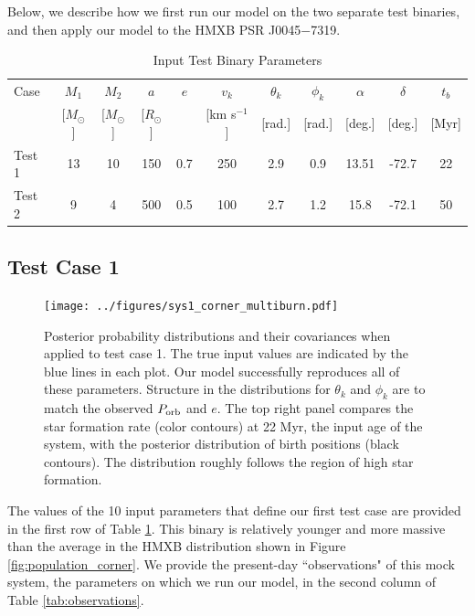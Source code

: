 \documentclass[usenatbib]{mnras}
\begin{document}
Below, we describe how we first run our model on the two separate test binaries, and then apply our model to the HMXB PSR J0045$-$7319.


\begin{table}
\label{tab:mock_data}
\begin{center}
\caption{Input Test Binary Parameters}
\begin{tabular}{lcccccccccc} 
\toprule
Case & $M_1$ & $M_2$ & $a$ & $e$ & $v_k$ & $\theta_k$ & $\phi_k$ & $\alpha$ & $\delta$ & $t_b$ \\
 & [$M_{\odot}$] & [$M_{\odot}$] & [$R_{\odot}$] & & [km s$^{-1}$] & [rad.] & [rad.] & [deg.] & [deg.] & [Myr] \\ 
\midrule
Test 1 & 13 & 10 & 150 & 0.7 & 250 & 2.9 & 0.9 & 13.51 & -72.7 & 22 \\
Test 2 & 9 & 4 & 500 & 0.5 & 100 & 2.7 & 1.2 & 15.8 & -72.1 & 50 \\
\bottomrule
\end{tabular}
\end{center}
\end{table}


\subsection{Test Case 1}


\begin{figure}
\begin{center}
\texttt{[image: ../figures/sys1\_corner\_multiburn.pdf]}
\caption{Posterior probability distributions and their covariances when applied to test case 1. The true input values are indicated by the blue lines in each plot. Our model successfully reproduces all of these parameters. Structure in the distributions for $\theta_k$ and $\phi_k$ are to match the observed $P_{\rm orb}$ and $e$. The top right panel compares the star formation rate (color contours) at 22 Myr, the input age of the system, with the posterior distribution of birth positions (black contours). The distribution roughly follows the region of high star formation. }
\label{fig:test1_corner}
\end{center}
\end{figure}

The values of the 10 input parameters that define our first test case are provided in the first row of Table \ref{tab:mock_data}. This binary is relatively younger and more massive than the average in the HMXB distribution shown in Figure \ref{fig:population_corner}. We provide the present-day ``observations" of this mock system, the parameters on which we run our model, in the second column of Table \ref{tab:observations}.
\end{document}
